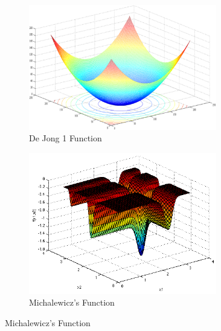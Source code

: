 \documentclass{article}
\begin{document}
\begin{figure}[H]
\begin{minipage}{.5\textwidth}
        \end{minipage}
        \begin{minipage}{.5\textwidth}
            \begin{figure}[H]
                \centering
                \includegraphics[width=0.9\textwidth,height=\textheight,keepaspectratio]{fig_jong}
                \caption{De Jong 1 Function}
            \end{figure}
        \end{minipage}%
        \begin{minipage}{.5\textwidth}
          \centering
            \begin{figure}[H]
                \centering
                \includegraphics[width=0.9\textwidth,height=\textheight,keepaspectratio]{fig_michal}
                \caption{Michalewicz's Function}
            \end{figure}
        \end{minipage}
    \end{figure}
\end{document}
